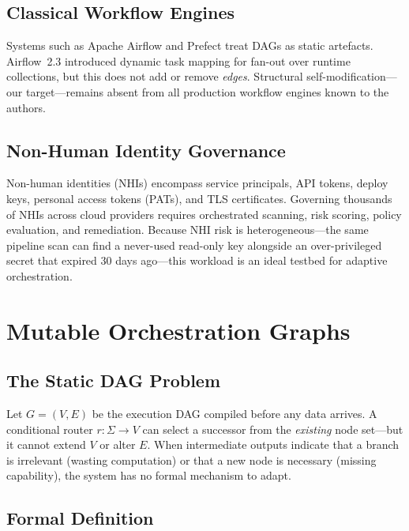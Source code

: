 \documentclass[conference]{IEEEtran}
\begin{document}
\subsection{Classical Workflow Engines}
Systems such as Apache Airflow and Prefect treat DAGs as static
artefacts. Airflow~2.3 introduced dynamic task mapping for fan-out
over runtime collections, but this does not add or remove \emph{edges}.
Structural self-modification---our target---remains absent from all
production workflow engines known to the authors.

\subsection{Non-Human Identity Governance}
Non-human identities (NHIs) encompass service principals, API tokens,
deploy keys, personal access tokens (PATs), and TLS certificates.
Governing thousands of NHIs across cloud providers requires orchestrated
scanning, risk scoring, policy evaluation, and remediation. Because
NHI risk is heterogeneous---the same pipeline scan can find a
never-used read-only key alongside an over-privileged secret that
expired 30 days ago---this workload is an ideal testbed for adaptive
orchestration.

\section{Mutable Orchestration Graphs}
\label{sec:formalism}

\subsection{The Static DAG Problem}

Let $G=(V,E)$ be the execution DAG compiled before any data arrives.
A conditional router $r\colon\Sigma\to V$ can select a successor from
the \emph{existing} node set---but it cannot extend $V$ or alter $E$.
When intermediate outputs indicate that a branch is irrelevant (wasting
computation) or that a new node is necessary (missing capability), the
system has no formal mechanism to adapt.

\subsection{Formal Definition}
\end{document}

